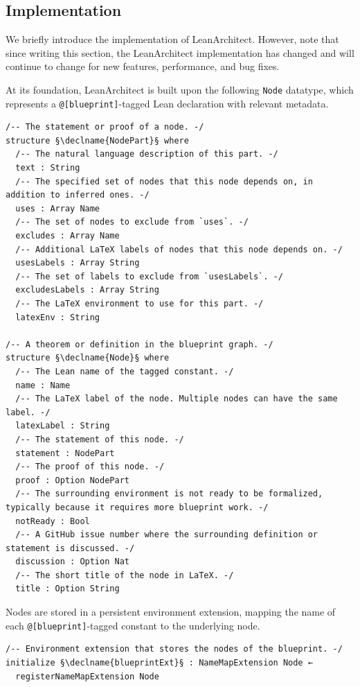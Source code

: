 \documentclass{article}
\newcommand{\leanarchitect}{LeanArchitect\xspace}
\newcommand{\declname}[1]{{\ttfamily\color{declnamecolor}#1}}
\newcommand\leancode{\lstinline[language=lean]}
\begin{document}
\subsection{Implementation}

We briefly introduce the implementation of \leanarchitect. However, note that since writing this section, the \leanarchitect implementation has changed and will continue to change for new features, performance, and bug fixes.

At its foundation, \leanarchitect is built upon the following \leancode{Node} datatype, which represents a \leancode{@[blueprint]}-tagged Lean declaration with relevant metadata.

\begin{lstlisting}
/-- The statement or proof of a node. -/
structure §\declname{NodePart}§ where
  /-- The natural language description of this part. -/
  text : String
  /-- The specified set of nodes that this node depends on, in addition to inferred ones. -/
  uses : Array Name
  /-- The set of nodes to exclude from `uses`. -/
  excludes : Array Name
  /-- Additional LaTeX labels of nodes that this node depends on. -/
  usesLabels : Array String
  /-- The set of labels to exclude from `usesLabels`. -/
  excludesLabels : Array String
  /-- The LaTeX environment to use for this part. -/
  latexEnv : String

/-- A theorem or definition in the blueprint graph. -/
structure §\declname{Node}§ where
  /-- The Lean name of the tagged constant. -/
  name : Name
  /-- The LaTeX label of the node. Multiple nodes can have the same label. -/
  latexLabel : String
  /-- The statement of this node. -/
  statement : NodePart
  /-- The proof of this node. -/
  proof : Option NodePart
  /-- The surrounding environment is not ready to be formalized, typically because it requires more blueprint work. -/
  notReady : Bool
  /-- A GitHub issue number where the surrounding definition or statement is discussed. -/
  discussion : Option Nat
  /-- The short title of the node in LaTeX. -/
  title : Option String
\end{lstlisting}

Nodes are stored in a persistent environment extension, mapping the name of each \leancode{@[blueprint]}-tagged constant to the underlying node.

\begin{lstlisting}
/-- Environment extension that stores the nodes of the blueprint. -/
initialize §\declname{blueprintExt}§ : NameMapExtension Node ←
  registerNameMapExtension Node
\end{lstlisting}
\end{document}
